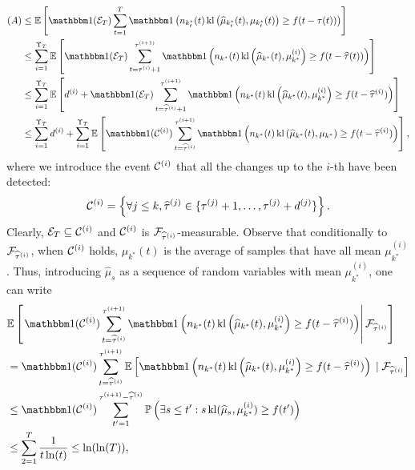 \begin{align*}
    (A) & \leq \bE\left[\indic(\cE_T) \sum_{t=1}^T \indic\left(n_{k_t^*}(t) \, \kl\left(\widehat{\mu}_{k_t^*}(t), \mu_{k_t^*}(t)\right) \geq f(t - \tau(t))\right)\right] \\
    & \leq \sum_{i=1}^{\Upsilon_T}\bE\left[\indic(\cE_T) \sum_{t=\tau^{(i)}+1}^{\tau^{(i+1)}} \indic\left(n_{k^*}(t) \, \kl\left(\widehat{\mu}_{k^*}(t), \mu_{k^*}^{(i)}\right) \geq f(t - \widehat{\tau}(t))\right)\right] \\
    & \leq \sum_{i=1}^{\Upsilon_T}\bE\left[ d^{(i)} + \indic(\cE_T) \sum_{t=\widehat{\tau}^{(i)}+1}^{\tau^{(i+1)}} \indic\left(n_{k^*}(t) \, \kl\left(\widehat{\mu}_{k^*}(t), \mu_{k^*}^{(i)}\right) \geq f(t - \widehat{\tau}^{(i)})\right)\right] \\
    & \leq \sum_{i=1}^{\Upsilon_T}d^{(i)} + \sum_{i=1}^{\Upsilon_T}\bE\left[\indic(\cC^{(i)}) \sum_{t=\widehat{\tau}^{(i)}}^{\tau^{(i+1)}}\indic\left(n_{k^*}(t) \, \kl\left(\widehat{\mu}_{k^*}(t), \mu_{k^*}\right) \geq f(t - \widehat{\tau}^{(i)})\right)\right],
\end{align*}
%
where we introduce the event $\mathcal{C}^{(i)}$ that all the changes up to the $i$-th have been detected:
%
\begin{equation}\label{def:6:EventCiGlobal}
    \mathcal{C}^{(i)} = \left\{\forall j \leq k, \widehat{\tau}^{(j)} \in \{\tau^{(j)} + 1, \dots, \tau^{(j)} + d^{(j)} \} \right\}.
\end{equation}
%
Clearly, $\mathcal{E}_T \subseteq \mathcal{C}^{(i)}$ and $\mathcal{C}^{(i)}$ is $\mathcal{F}_{\widehat{\tau}^{(i)}}$-measurable. Observe that conditionally to $\mathcal{F}_{\widehat{\tau}^{(i)}}$, when $\mathcal{C}^{(i)}$ holds, $\widehat{\mu}_{k^*}(t)$ is the average of samples that have all mean $\mu_{k^*}^{(i)}$.
%
Thus, introducing $\widehat{\mu}_s$ as a sequence of \iid{} random variables with mean $\mu_{k^*}^{(i)}$, one can write
%
\begin{align*}
    &\bE\left[\left.\indic(\cC^{(i)}) \sum_{t=\widehat{\tau}^{(i)}}^{\tau^{(i+1)}} \indic\left(n_{k^*}(t) \, \kl\left(\widehat{\mu}_{k^*}(t), \mu_{k^*}^{(i)}\right) \geq f(t - \widehat{\tau}^{(i)})\right) \right| \cF_{\widehat{\tau}^{(i)}}\right]\\
    & = \indic(\cC^{(i)}) \sum_{t=\widehat{\tau}^{(i)}}^{\tau^{(i+1)}} \bE\left[\indic\left(n_{k^*}(t) \, \kl\left(\widehat{\mu}_{k^*}(t), \mu_{k^*}^{(i)}\right) \geq f(t - \widehat{\tau}^{(i)})\right) \;|\; \cF_{\widehat{\tau}^{(i)}}\right] \\
    & \leq \indic(\cC^{(i)}) \sum_{t'=1}^{\tau^{(i+1)} - \widehat{\tau}^{(i)}} \bP\left(\exists s \leq t' : s \, \kl(\widehat{\mu}_{s},\mu_{k^*}^{(i)}) \geq f(t')\right) \\
    & \leq \sum_{2=1}^T \frac{1}{t\ln(t)} \leq \ln(\ln(T)),
\end{align*}
